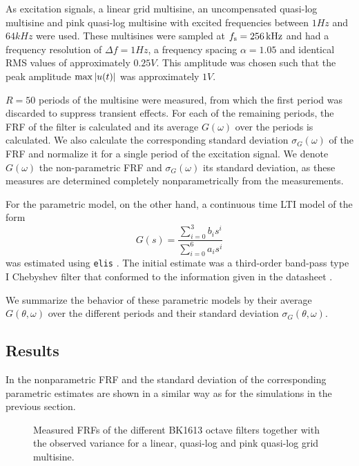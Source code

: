     As excitation signals, a linear grid multisine, an uncompensated quasi-log multisine and pink quasi-log multisine with excited frequencies between $1 \unit{Hz}$ and $64 \unit{kHz}$ were used.
    These multisines were sampled at $f_{\mathrm{s}} = 256\,\mathrm{kHz}$ and had a frequency resolution of $\Delta f = 1 \unit{Hz}$, a frequency spacing $\alpha = 1.05$ and identical RMS values of approximately $0.25 \unit{V}$.
    This amplitude was chosen such that the peak amplitude $\max \left| u(t) \right|$ was approximately $1 \unit{V}$.

    $R=50$ periods of the multisine were measured, from which the first period was discarded to suppress transient effects.
    For each of the remaining periods, the FRF of the filter is calculated and its average $G\left(\omega \right)$ over the periods is calculated.
    We also calculate the corresponding standard deviation $\sigma_G\left( \omega \right)$ of the FRF and normalize it for a single period of the excitation signal.
    We denote $G\left(\omega \right)$ the non-parametric FRF and $\sigma_G\left( \omega \right)$ its standard deviation, as these measures are determined completely nonparametrically from the measurements.

    For the parametric model, on the other hand, a continuous time \gls{LTI} model of the form
    \begin{equation}
      G(s) = \frac{\sum_{i=0}^3 b_i s^i}{\sum_{i=0}^6 a_i s^i}
    \end{equation}
    was estimated using \texttt{elis} \citep{FDIDENT}.
    The initial estimate was a third-order band-pass type I Chebyshev filter \citep{Zverev1967} that conformed to the information given in the datasheet \citep{datasheet_bk1613}.

    We summarize the behavior of these parametric models by their average $G\left(\theta,\omega \right)$ over the different periods and their standard deviation $\sigma_G\left(\theta,\omega \right)$.

    \subsection{Results}
    In  the nonparametric FRF and the standard deviation of the corresponding parametric estimates are shown in a similar way as for the simulations in the previous section.

    \begin{figure}%
    \centering
      \setlength\figureheight{5cm}
      \setlength{}
    
    \caption[Measured FRFs of all BK1613 octave filters and their variance for different excitation signals.]{Measured FRFs of the different \bruelkjaer BK1613 octave filters together with the observed variance for a linear, quasi-log and pink quasi-log grid multisine.}%
      \label{fig:measurements}
    \end{figure}

